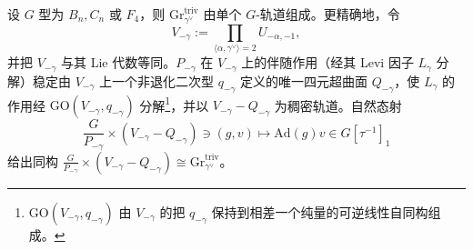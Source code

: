 \begin{lemma}
设 $G$ 型为 $B_n,C_n$ 或 $F_4$，则 $\mathrm{Gr}^{\mathrm{triv}}_{\gamma^\vee}$ 由单个 $G$-轨道组成。更精确地，令
\[
V_{-\gamma}:=\prod_{\langle\alpha,\gamma^\vee\rangle=2}U_{-\alpha,-1},
\]
并把 $V_{-\gamma}$ 与其 Lie 代数等同。$P_{-\gamma}$ 在 $V_{-\gamma}$ 上的伴随作用（经其 Levi 因子 $L_\gamma$ 分解）稳定由 $V_{-\gamma}$ 上一个非退化二次型 $q_{-\gamma}$ 定义的唯一四元超曲面 $Q_{-\gamma}$，使 $L_\gamma$ 的作用经 $\mathrm{GO}(V_{-\gamma},q_{-\gamma})$ 分解\footnote{$\mathrm{GO}(V_{-\gamma},q_{-\gamma})$ 由 $V_{-\gamma}$ 的把 $q_{-\gamma}$ 保持到相差一个纯量的可逆线性自同构组成。}，并以 $V_{-\gamma}-Q_{-\gamma}$ 为稠密轨道。自然态射
\begin{equation}
\frac{G}{P_{-\gamma}}\times(V_{-\gamma}-Q_{-\gamma})\ni(g,v)\mapsto\mathrm{Ad}(g)v\in G[\tau^{-1}]_1
\end{equation}
给出同构 $\frac{G}{P_{-\gamma}}\times(V_{-\gamma}-Q_{-\gamma})\cong\mathrm{Gr}^{\mathrm{triv}}_{\gamma^\vee}$。
\end{lemma}

